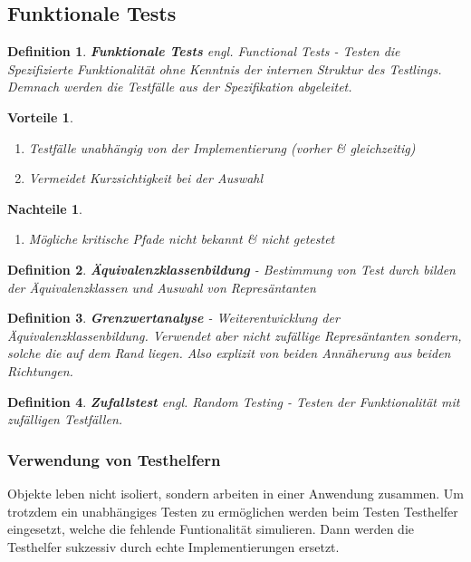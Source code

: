 \documentclass[a4paper]{article}
\theoremstyle{break}
\newtheorem{defi}{Definition}[section]
\newtheorem{why}{Vorteile}[section]
\newtheorem{whynot}{Nachteile}[section]
\begin{document}
        \subsection{Funktionale Tests}
        \begin{defi}
          \textbf{Funktionale Tests} \textit{engl. Functional Tests} - Testen die Spezifizierte Funktionalität ohne Kenntnis der internen Struktur des Testlings. Demnach werden die Testf\"alle aus der Spezifikation abgeleitet.
        \end{defi}
        \begin{why}
          \begin{enumerate}
          \item Testf\"alle unabh\"angig von der Implementierung (vorher \& gleichzeitig)
          \item Vermeidet Kurzsichtigkeit bei der Auswahl
          \end{enumerate}
        \end{why}
        \begin{whynot}
          \begin{enumerate}
          \item M\"ogliche kritische Pfade nicht bekannt \& nicht getestet
          \end{enumerate}
        \end{whynot}

        \begin{defi}
          \textbf{\"Aquivalenzklassenbildung} - Bestimmung von Test durch bilden der \"Aquivalenzklassen und Auswahl von Repres\"antanten
        \end{defi}

        \begin{defi}
          \textbf{Grenzwertanalyse} - Weiterentwicklung der \"Aquivalenzklassenbildung. Verwendet aber nicht zuf\"allige Repres\"antanten sondern, solche die auf dem Rand liegen.
          Also explizit von beiden Ann\"aherung aus beiden Richtungen.
        \end{defi}

        \begin{defi}
          \textbf{Zufallstest} \textit{engl. Random Testing} - Testen der Funktionalität mit zuf\"alligen Testf\"allen.
        \end{defi}

        \subsubsection{Verwendung von Testhelfern}
        Objekte leben nicht isoliert, sondern arbeiten in einer Anwendung zusammen. Um trotzdem ein unabh\"angiges Testen zu erm\"oglichen werden beim Testen Testhelfer eingesetzt, welche die fehlende Funtionalit\"at simulieren. Dann werden die Testhelfer sukzessiv durch echte Implementierungen ersetzt.
\end{document}
